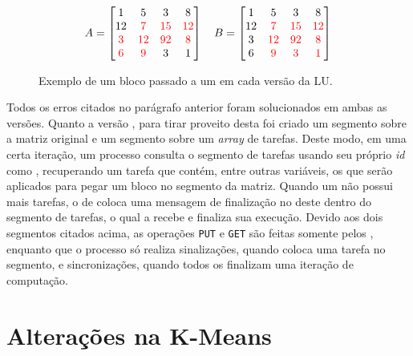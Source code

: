 \begin{figure}[h]
  \centering
  \caption{Exemplo de um bloco passado a um \slave em cada versão da LU.}
  \label{fig:rightandwrongblocks}
  \[
    A=
    \begin{bmatrix}
      1  & 5  & 3  & 8  \\
      12 & \color{red} 7  & \color{red} 15 & \color{red} 12 \\
      \color{red}  3  & \color{red}  12 & \color{red}  92 & \color{red} 8 \\
      \color{red}  6  & \color{red}  9  & 3  & 1 
    \end{bmatrix}\quad
    B=
    \begin{bmatrix}
      1  & 5  & 3  & 8  \\
      12 & \color{red} 7  & \color{red} 15 & \color{red} 12 \\
      3  & \color{red} 12 & \color{red} 92 & \color{red} 8 \\
      6  & \color{red} 9  & \color{red} 3  & \color{red} 1 
    \end{bmatrix}
  \]
\end{figure}

Todos os erros citados no parágrafo anterior foram solucionados em ambas as versões. Quanto a versão \ASYNC, para tirar proveito desta \API foi criado um segmento sobre a matriz original e um segmento sobre um \textit{array} de tarefas. Deste modo, em uma certa iteração, um processo \slave consulta o segmento de tarefas usando seu próprio \textit{id} como \offset, recuperando um tarefa que contém, entre outras variáveis, os \offsets que serão aplicados para pegar um bloco no segmento da matriz. Quando um \CC não possui mais tarefas, o \cluster de \IO coloca uma mensagem de finalização no \offset deste \slave dentro do segmento de tarefas, o qual a recebe e finaliza sua execução. Devido aos dois segmentos citados acima, as operações \texttt{PUT} e \texttt{GET} são feitas somente pelos \CCs, enquanto que o processo \master só realiza sinalizações, quando coloca uma tarefa no segmento, e sincronizações, quando todos os \slaves finalizam uma iteração de computação.

\section{Alterações na K-Means}
\label{sec:alteracoeskm}

